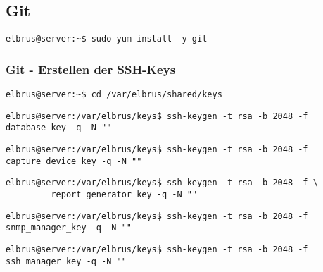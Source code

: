 \documentclass{article}
\begin{document}
	\subsection{Git}
	
	\lstset{style=commands}
	\begin{lstlisting}[caption={Installieren von dem VCS 'git'.}]
		elbrus@server:~$ sudo yum install -y git
	\end{lstlisting}
	
	\lstset{style=commands}
	\subsubsection{Git - Erstellen der SSH-Keys}
	\begin{lstlisting}[caption={Wechseln des Verzeichnisses.}]
		elbrus@server:~$ cd /var/elbrus/shared/keys
	\end{lstlisting}
	
	\lstset{style=commands}
	\begin{lstlisting}[caption={Erstellen des SSH-keys der für das Herunterladen der 'Database' benötigt wird.}]
		elbrus@server:/var/elbrus/keys$ ssh-keygen -t rsa -b 2048 -f database_key -q -N ""
	\end{lstlisting}

	\lstset{style=commands}
	\begin{lstlisting}[caption={Erstellen des SSH-keys der für das Herunterladen des 'Capture-Device' benötigt wird.}]
		elbrus@server:/var/elbrus/keys$ ssh-keygen -t rsa -b 2048 -f capture_device_key -q -N ""
	\end{lstlisting}

	\lstset{style=commands}
	\begin{lstlisting}[caption={Erstellen des SSH-keys der für das Herunterladen des 'Report-Generator' benötigt wird.}]
		elbrus@server:/var/elbrus/keys$ ssh-keygen -t rsa -b 2048 -f \
		 report_generator_key -q -N ""
	\end{lstlisting}

	\lstset{style=commands}
	\begin{lstlisting}[caption={Erstellen des SSH-keys der für das Herunterladen des 'SNMP-Managers' benötigt wird.}]
		elbrus@server:/var/elbrus/keys$ ssh-keygen -t rsa -b 2048 -f snmp_manager_key -q -N ""
	\end{lstlisting}

	\lstset{style=commands}
	\begin{lstlisting}[caption={Erstellen des SSH-keys der für das Herunterladen des 'SSH-Managers' benötigt wird.}]
		elbrus@server:/var/elbrus/keys$ ssh-keygen -t rsa -b 2048 -f ssh_manager_key -q -N ""
	\end{lstlisting}
	
\end{document}
